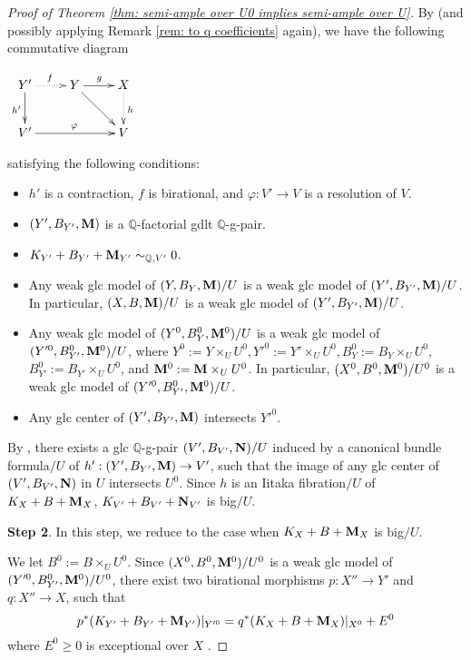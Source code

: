 \documentclass[11pt]{amsart}
\numberwithin{equation}{section}
\newcommand{\Mm}{{\bf{M}}}
\newcommand{\NN}{{\bf{N}}}
\theoremstyle{definition}
\theoremstyle{definition}
\theoremstyle{definition}
\begin{document}
\begin{proof}[Proof of Theorem \ref{thm: semi-ample over U0 implies
  semi-ample over U}]
  By \cite[Theorem 4.2]{LX22} (and possibly applying Remark \ref{rem:
  to q coefficients} again), we have the following commutative diagram
  \begin{center}$\xymatrix{
      Y'\ar@{->}[d]_{h'}\ar@{.>}[r]^{f}& Y\ar@{->}[r]^{g}\ar@{->}[dr]
      & X\ar@{.>}[d]^{h}\\
      V'\ar@{->}[rr]^{\varphi} & & V\\
    }$
  \end{center}
  satisfying the following conditions:
  \begin{itemize}
    \item $h'$ is a contraction, $f$ is birational, and $\varphi:
      V'\rightarrow V$ is a resolution of $V$.
    \item $(Y',B_{Y'},\Mm)$ is a $\mathbb Q$-factorial gdlt $\mathbb Q$-g-pair.
    \item $K_{Y'}+B_{Y'}+\Mm_{Y'}\sim_{\mathbb Q,V'}0$.
    \item Any weak glc model of $(Y,B_Y,\Mm)/U$ is a weak glc model
      of $(Y',B_{Y'},\Mm)/U$. In particular, $(X,B,\Mm)/U$ is a weak
      glc model of $(Y',B_{Y'},\Mm)/U$.
    \item Any weak glc model of $(Y^0,B^0_Y,\Mm^0)/U$ is a weak glc
      model of $(Y'^0,B^0_{Y'},\Mm^0)/U$, where
      $Y^0:=Y\times_UU^0,Y'^0:=Y'\times_UU^0,B^0_Y:=B_Y\times_UU^0$,
      $B^0_{Y'}:=B_{Y'}\times_UU^0$, and $\Mm^0:=\Mm\times_UU^0$. In
      particular, $(X^0,B^0,\Mm^0)/U^0$ is a weak glc model of
      $(Y'^0,B^0_{Y'},\Mm^0)/U$.
    \item Any glc center of $(Y',B_{Y'},\Mm)$ intersects  $Y'^0$.
  \end{itemize}
  By \cite[Theorem 2.16]{LX22}, there exists a glc $\mathbb Q$-g-pair
  $(V',B_{V'},\NN)/U$ induced by a canonical bundle formula$/U$ of
  $h': (Y',B_{Y'},\Mm)\rightarrow V'$, such that the image of any glc
  center of $(V',B_{V'},\NN)$ in $U$ intersects $U^0$. Since $h$ is
  an Iitaka fibration$/U$ of $K_X+B+\Mm_X$, $K_{V'}+B_{V'}+\NN_{V'}$ is big$/U$.

  \medskip

  \noindent\textbf{Step 2}. In this step, we reduce to the case when
  $K_X+B+\Mm_X$ is big$/U$.

  \smallskip

  We let $B^0:=B\times_UU^0$. Since $(X^0,B^0,\Mm^0)/U^0$ is a weak
  glc model of $(Y'^0,B_{Y'}^0,\Mm^0)/U^0$, there exist two
  birational morphisms $p: X''\rightarrow Y'$ and $q: X''\rightarrow
  X$, such that
  $$p^*(K_{Y'}+B_{Y'}+\Mm_{Y'})|_{Y'^0}=q^*(K_X+B+\Mm_X)|_{X^0}+E^0$$
  where $E^0\geq 0$ is exceptional over $X$ \cite[Lemma 3.8]{HL21a}.


\end{proof}
\end{document}
